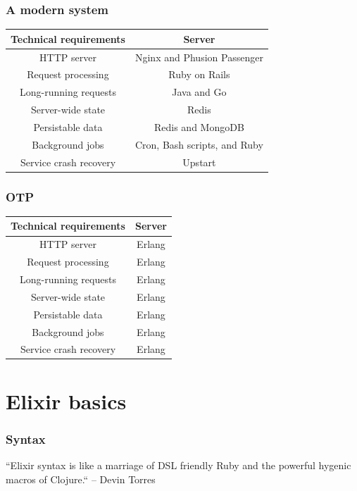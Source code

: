 \documentclass{beamer}
\begin{document}
\begin{frame}
  \frametitle{A modern system}
  \begin{center}
    \begin{tabular}{c|c}
      \hline
      Technical requirements & Server \\ \hline
      HTTP server & Nginx and Phusion Passenger \\
      Request processing & Ruby on Rails \\
      Long-running requests & Java and Go \\
      Server-wide state & Redis \\
      Persistable data & Redis and MongoDB \\
      Background jobs & Cron, Bash scripts, and Ruby \\
      Service crash recovery & Upstart \\
      \hline
    \end{tabular}
  \end{center}
\end{frame}

\begin{frame}
  \frametitle{OTP}
  \begin{center}
    \begin{tabular}{c|c}
      \hline
      Technical requirements & Server \\ \hline
      HTTP server & Erlang \\
      Request processing & Erlang \\
      Long-running requests & Erlang \\
      Server-wide state & Erlang \\
      Persistable data & Erlang \\
      Background jobs & Erlang \\
      Service crash recovery & Erlang \\
      \hline
    \end{tabular}
  \end{center}
\end{frame}

\section[Section]{Elixir basics}

\begin{frame}
  \frametitle{Syntax}
  ``Elixir syntax is like a marriage of DSL
  friendly Ruby and the powerful hygenic macros of Clojure.``
  \linebreak
  \textrm{-- Devin Torres}
\end{frame}
\end{document}
